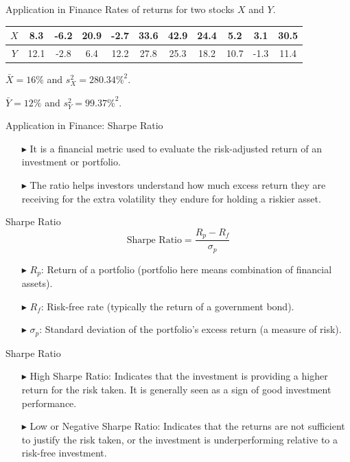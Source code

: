 \documentclass[12pt]{beamer}
\begin{document}
\begin{frame}{Application in Finance}
	Rates of returns for two stocks $X$ and $Y$.
		\vspace{0.5cm}
		
		\begin{center}
			\begin{tabular}{|c|c|c|c|c|c|c|c|c|c|c|}
				\hline
				$X$ & 8.3 &-6.2&20.9 &-2.7 &33.6&42.9&24.4&5.2&3.1&30.5\\
				\hline
				$Y$ & 12.1 &-2.8& 6.4& 12.2&27.8&25.3&18.2&10.7&-1.3&11.4\\
				\hline
			\end{tabular}
		\end{center}
		\vspace{0.5cm}
$\bar{X}=16\%$ and $s_X^2=280.34\%^2$.

$\bar{Y}=12\%$ and $s_Y^2=99.37\%^2$.
\end{frame}
\begin{frame}{Application in Finance: Sharpe Ratio}
	\begin{itemize}
		\item[$\blacktriangleright$] It is a financial metric used to evaluate the risk-adjusted return of an investment or portfolio.
		\item[$\blacktriangleright$] The ratio helps investors understand how much excess return they are receiving for the extra volatility they endure for holding a riskier asset.
	\end{itemize}
\end{frame}
\begin{frame}{Sharpe Ratio}
	$$\text{Sharpe Ratio}=\frac{R_p-R_f}{\sigma_p}$$
	\begin{itemize}
		\item[$\blacktriangleright$] $R_p$: Return of a portfolio (portfolio here means combination of financial assets).
		\item[$\blacktriangleright$] $R_f$: Risk-free rate (typically the return of a government bond).
		\item[$\blacktriangleright$] $\sigma_p$: Standard deviation of the portfolio’s excess return (a measure of risk).
	\end{itemize}
\end{frame}
\begin{frame}{Sharpe Ratio}
	\begin{itemize}
		\item[$\blacktriangleright$] High Sharpe Ratio: Indicates that the investment is providing a higher return for the risk taken. It is generally seen as a sign of good investment performance.
		\item[$\blacktriangleright$] Low or Negative Sharpe Ratio: Indicates that the returns are not sufficient to justify the risk taken, or the investment is underperforming relative to a risk-free investment.
	\end{itemize}
\end{frame}
\end{document}
